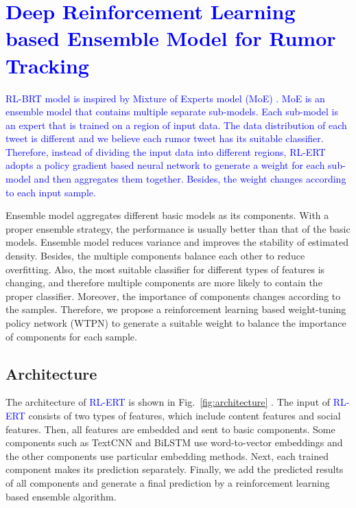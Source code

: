 \section{\textcolor{blue}{Deep Reinforcement Learning based Ensemble Model for Rumor Tracking}}
\label{sec:model}

\textcolor{blue}{RL-BRT model is inspired by Mixture of Experts model (MoE) \cite{DBLP:conf/nips/MillerU96}. MoE is an ensemble model that contains multiple separate sub-models. Each sub-model is an expert that is trained on a region of input data. The data distribution of each tweet is different and we believe each rumor tweet has its suitable classifier. Therefore, instead of dividing the input data into different regions, RL-ERT adopts a policy gradient based neural network to generate a weight for each sub-model and then aggregates them together. Besides, the weight changes according to each input sample.}

Ensemble model \cite{DBLP:journals/ml/Breiman96b} aggregates different basic models as its components. With a proper ensemble strategy, the performance is usually better than that of the basic models. Ensemble model reduces variance and improves the
stability of estimated density. Besides, the multiple components balance each other to reduce overfitting. Also, the most suitable classifier for different types of features is changing, and therefore multiple components are more likely to contain the proper classifier. Moreover, the importance of components changes according to the samples. Therefore, we propose a reinforcement learning based weight-tuning policy network (WTPN) to generate a suitable weight to balance the importance of components for each sample. 

\subsection{Architecture}
\label{sec:architecture}
The architecture of \textcolor{blue}{RL-ERT} is shown in Fig.~\ref{fig:architecture} . The input of \textcolor{blue}{RL-ERT} consists of two types of features, which include content features and social features. Then, all features are embedded and sent to basic components.  Some components such as TextCNN and BiLSTM use word-to-vector embeddings and the other components use particular embedding methods. Next, each trained component makes its prediction separately. Finally, we add the predicted results of all components and generate a final prediction by a reinforcement learning based ensemble algorithm.

